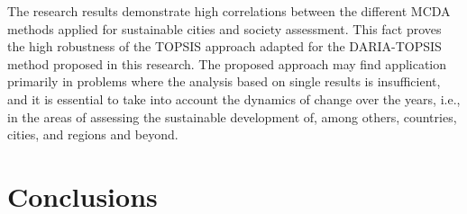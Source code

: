 \documentclass[final,5p,times,twocolumn,authoryear]{elsarticle}
\begin{document}
\begin{table}[H]
\centering
\caption{Trends in sustainability indicators published by Eurostat for United Kingdom.}
\label{tab:UKTrends}
\end{table}
%

The research results demonstrate high correlations between the different MCDA methods applied for sustainable cities and society assessment. This fact proves the high robustness of the TOPSIS approach adapted for the DARIA-TOPSIS method proposed in this research. The proposed approach may find application primarily in problems where the analysis based on single results is insufficient, and it is essential to take into account the dynamics of change over the years, i.e., in the areas of assessing the sustainable development of, among others, countries, cities, and regions and beyond.

\section{Conclusions}
\label{sec:concl}
\end{document}
